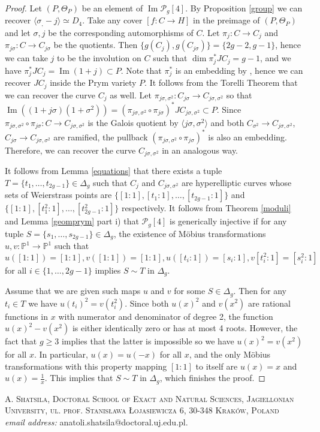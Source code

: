 \documentclass{article}
\numberwithin{equation}{section}
\newcommand{\s}{\sigma}
\DeclareMathOperator{\Image}{Im}
\begin{document}
\begin{proof}
    Let $(P, \Theta_P)$ be an element of $\Image\mathcal{P}_g[4]$. By Proposition \ref{group} we can recover $\langle \sigma_, -j \rangle \simeq D_4$. Take any cover $[f: C \to H]$ in the preimage of $(P, \Theta_P)$ and let $\sigma, j$ be the corresponding automorphisms of $C$. Let $\pi_j: C \to C_j$ and $\pi_{j\sigma}:C \to C_{j\s}$ be the quotients. Then $\{g(C_{j}), g(C_{j\s})\} = \{2g-2, g-1\}$, hence we can take $j$ to be the involution on $C$ such that $\dim \pi_j^*JC_j = g-1$, and we have $\pi_j^*JC_j = \Image(1+j) \subset P$. Note that $\pi_j^*$ is an embedding by \cite[Proposition 11.4.3]{BL}, hence we can recover $JC_j$ inside the Prym variety $P$. It follows from the Torelli Theorem that we can recover the curve $C_j$ as well. Let $\pi_{j\s, \s^2}:C_{j\s} \to C_{j\s, \s^2}$ so that $\Image((1+j\s)(1+\s^2)) = (\pi_{j\s,\s^2}\circ\pi_{j\s})^*JC_{j\s, \s^2} \subset P$. Since $\pi_{j\s,\s^2}\circ\pi_{j\s}: C \to C_{j\s, \s^2}$ is the Galois quotient by $\langle j\s, \s^2 \rangle$ and both $C_{\sigma^2} \to C_{j\s, \s^2}$,  $C_{j\s} \to C_{j\s, \s^2}$ are ramified, the pullback $(\pi_{j\s,\s^2}\circ\pi_{j\s})^*$ is also an embedding. Therefore, we can recover the curve $C_{j\s, \s^2}$ in an analogous way. 

    It follows from Lemma \ref{equations} that there exists a tuple $T = \{t_1, \ldots, t_{2g-1}\} \in \Delta_g$ such that $C_{j}$ and $C_{j\s, \s^2}$ are hyperelliptic curves whose sets of Weierstrass points are $\{[1:1], [t_1:1], \ldots, [t_{2g-1}:1]\}$ and $\{[1:1], [t_1^2:1], \ldots, [t_{2g-1}^2:1]\}$ respectively. It follows from Theorem \ref{moduli} and Lemma \ref{geomprym} part i) that $\mathcal{P}_g[4]$ is generically injective if for any tuple $S = \{s_1, \ldots, s_{2g-1}\} \in \Delta_g$, the existence of Möbius transformations $u, v: \mathbb{P}^1 \to \mathbb{P}^1$ such that $$u([1:1]) = [1:1], v([1:1]) = [1:1], u([t_i:1]) = [s_i:1], v[t_i^2:1] = [s_i^2:1]$$ for all $i \in \{1,\ldots, 2g-1\}$ implies 
    $S \sim T$ in $\Delta_g$. 

    Assume that we are given such maps $u$ and $v$ for some $S \in \Delta_g$. Then for any $t_i \in T$ we have $u(t_i)^2 = v(t_i^2)$. Since both $u(x)^2$ and $v(x^2)$ are rational functions in $x$ with numerator and denominator of degree 2, the function $u(x)^2 - v(x^2)$ is either identically zero or has at most 4 roots. However, the fact that $g \geq 3$ implies that the latter is impossible so we have $u(x)^2 = v(x^2)$ for all $x$. In particular, $u(x) = u(-x)$ for all $x$, and the only Möbius transformations with this property mapping $[1:1]$ to itself are $u(x) = x$ and $u(x) = \frac{1}{x}$. This implies that $S \sim T$ in $\Delta_g$, which finishes the proof.
      
\end{proof}




\textsc{A. Shatsila, Doctoral School of Exact and Natural Sciences, Jagiellonian University, ul. prof. Stanis\l{}awa Łojasiewicza 6, 30-348 Kraków, Poland}\\
\textit{email address:} anatoli.shatsila@doctoral.uj.edu.pl.
\end{document}

